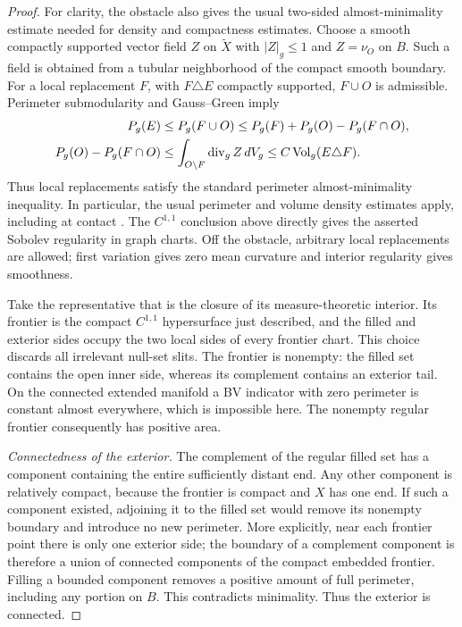 \begin{proof}
For clarity, the obstacle also gives the usual two-sided almost-minimality
estimate needed for density and compactness estimates. Choose a smooth
compactly supported vector field $Z$ on $\widetilde X$ with $|Z|_g\le1$
and $Z=\nu_O$ on $B$. Such a field is obtained from a tubular
neighborhood of the compact smooth boundary. For a local replacement
$F$, with $F\triangle E$ compactly supported, $F\cup O$ is admissible.
Perimeter submodularity and Gauss--Green imply
\begin{align}
 P_g(E)
 &\le P_g(F\cup O)
 \le P_g(F)+P_g(O)-P_g(F\cap O),\nonumber\\
 P_g(O)-P_g(F\cap O)
 &\le \int_{O\setminus F}\operatorname{div}_gZ\,dV_g
 \le C\operatorname{Vol}_g(E\triangle F).
 \label{rig4:enc:almost-minimality}
\end{align}
Thus local replacements satisfy the standard perimeter
almost-minimality inequality. In particular, the usual perimeter and
volume density estimates apply, including at contact
\cite{Maggi2012}. The $C^{1,1}$ conclusion above directly gives the
asserted Sobolev regularity in graph charts. Off the obstacle, arbitrary
local replacements are allowed; first variation gives zero mean
curvature and interior regularity gives smoothness.

Take the representative that is the closure of its measure-theoretic
interior. Its frontier is the compact $C^{1,1}$ hypersurface just
described, and the filled and exterior sides occupy the two local sides
of every frontier chart. This choice discards all irrelevant null-set
slits. The frontier is nonempty: the filled set contains the open
inner side, whereas its complement contains an exterior tail. On the
connected extended manifold a BV indicator with zero perimeter is
constant almost everywhere, which is impossible here. The nonempty
regular frontier consequently has positive area.

\emph{Connectedness of the exterior.}
The complement of the regular filled set has a component containing the
entire sufficiently distant end. Any other component is relatively
compact, because the frontier is compact and $X$ has one end. If such
a component existed, adjoining it to the filled set would remove its
nonempty boundary and introduce no new perimeter. More explicitly,
near each frontier point there is only one exterior side; the boundary
of a complement component is therefore a union of connected components
of the compact embedded frontier. Filling a bounded component removes
a positive amount of full perimeter, including any portion on $B$.
This contradicts minimality. Thus the exterior is connected.


\end{proof}
